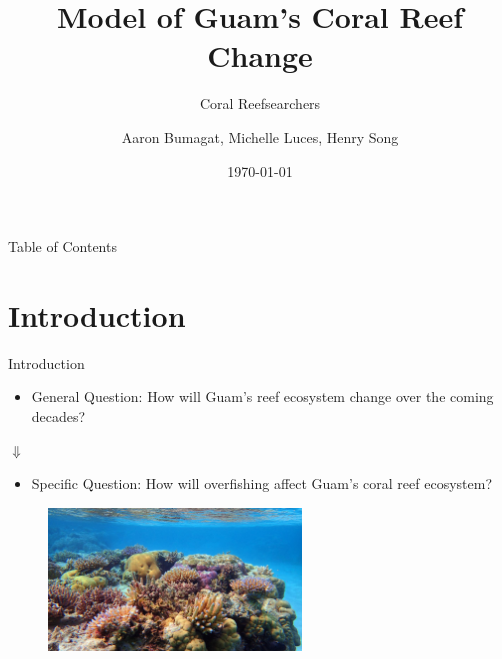 \documentclass{beamer}
\title[]{Model of Guam's Coral Reef Change}
\subtitle{Coral Reefsearchers}
\author{Aaron Bumagat, Michelle Luces, Henry Song }
\institute{University of Guam}
\date{\today}
\begin{document}
\frame{\titlepage}

\AtBeginSection[]{
    \begin{frame}{}
        \frametitle{}
        \setcounter{tocdepth}{2}
        \tableofcontents[currentsection, sections = \thesection]
        \setcounter{tocdepth}{1}
    \end{frame}
}

\begin{frame}{Table of Contents}
\tableofcontents
\end{frame}

\section{Introduction}
\begin{frame}{Introduction}
\begin{itemize}
    \item General Question: How will Guam's reef ecosystem change over the coming decades?
\end{itemize}
\begin{center}
    $\Downarrow$
\end{center}
\begin{itemize}
    \item Specific Question: How will overfishing affect Guam's coral reef ecosystem?
\end{itemize}
\begin{figure}
    \centering
    \includegraphics[width=0.6\textwidth]{Figures/coral_picture.jpg}
\end{figure}
\end{frame}
\end{document}
